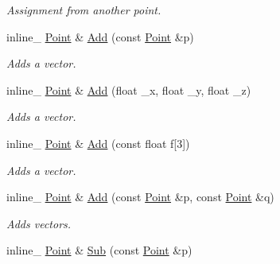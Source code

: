 \begin{DoxyCompactItemize}
\begin{DoxyCompactList}\small\item\em Assignment from another point. \end{DoxyCompactList}\item 
inline\+\_\+ \hyperlink{classPoint}{Point} \& \hyperlink{classPoint_a8f6c315514035e19a732196dfdab8b9a}{Add} (const \hyperlink{classPoint}{Point} \&p)\hypertarget{classPoint_a8f6c315514035e19a732196dfdab8b9a}{}\label{classPoint_a8f6c315514035e19a732196dfdab8b9a}

\begin{DoxyCompactList}\small\item\em Adds a vector. \end{DoxyCompactList}\item 
inline\+\_\+ \hyperlink{classPoint}{Point} \& \hyperlink{classPoint_a665a3c54701c9eccdec6c77ff33ac320}{Add} (float \+\_\+x, float \+\_\+y, float \+\_\+z)\hypertarget{classPoint_a665a3c54701c9eccdec6c77ff33ac320}{}\label{classPoint_a665a3c54701c9eccdec6c77ff33ac320}

\begin{DoxyCompactList}\small\item\em Adds a vector. \end{DoxyCompactList}\item 
inline\+\_\+ \hyperlink{classPoint}{Point} \& \hyperlink{classPoint_a1c1d68b7edfdc9157bd833597c1bb4c5}{Add} (const float f\mbox{[}3\mbox{]})\hypertarget{classPoint_a1c1d68b7edfdc9157bd833597c1bb4c5}{}\label{classPoint_a1c1d68b7edfdc9157bd833597c1bb4c5}

\begin{DoxyCompactList}\small\item\em Adds a vector. \end{DoxyCompactList}\item 
inline\+\_\+ \hyperlink{classPoint}{Point} \& \hyperlink{classPoint_a973e7eb0cc3ea025807d02c318ffe30f}{Add} (const \hyperlink{classPoint}{Point} \&p, const \hyperlink{classPoint}{Point} \&q)\hypertarget{classPoint_a973e7eb0cc3ea025807d02c318ffe30f}{}\label{classPoint_a973e7eb0cc3ea025807d02c318ffe30f}

\begin{DoxyCompactList}\small\item\em Adds vectors. \end{DoxyCompactList}\item 
inline\+\_\+ \hyperlink{classPoint}{Point} \& \hyperlink{classPoint_abe4b375de94964c8955568f045dea370}{Sub} (const \hyperlink{classPoint}{Point} \&p)\hypertarget{classPoint_abe4b375de94964c8955568f045dea370}{}\label{classPoint_abe4b375de94964c8955568f045dea370}


\end{DoxyCompactItemize}
